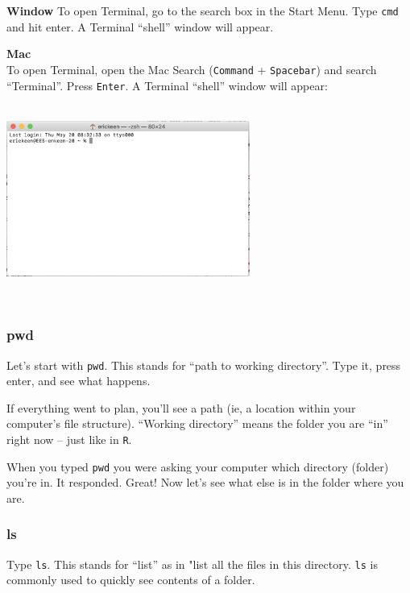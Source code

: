 \documentclass[]{book}
\begin{document}
\textbf{Window}
To open Terminal, go to the search box in the Start Menu. Type \texttt{cmd} and hit enter. A Terminal ``shell'' window will appear.

\textbf{Mac}\\
To open Terminal, open the Mac Search (\texttt{Command} + \texttt{Spacebar}) and search ``Terminal''. Press \texttt{Enter}. A Terminal ``shell'' window will appear:

~\\

\includegraphics[width=0.6\textwidth,height=\textheight]{img/bash-mac.png}

~

\hypertarget{pwd}{%
\subsubsection*{pwd}\label{pwd}}

Let's start with \texttt{pwd}. This stands for ``path to working directory''. Type it, press enter, and see what happens.

If everything went to plan, you'll see a path (ie, a location within your computer's file structure). ``Working directory'' means the folder you are ``in'' right now -- just like in \texttt{R}.

When you typed \texttt{pwd} you were asking your computer which directory (folder) you're in. It responded. Great! Now let's see what else is in the folder where you are.

\hypertarget{ls}{%
\subsubsection*{ls}\label{ls}}

Type \texttt{ls}. This stands for ``list'' as in "list all the files in this directory. \texttt{ls} is commonly used to quickly see contents of a folder.
\end{document}
